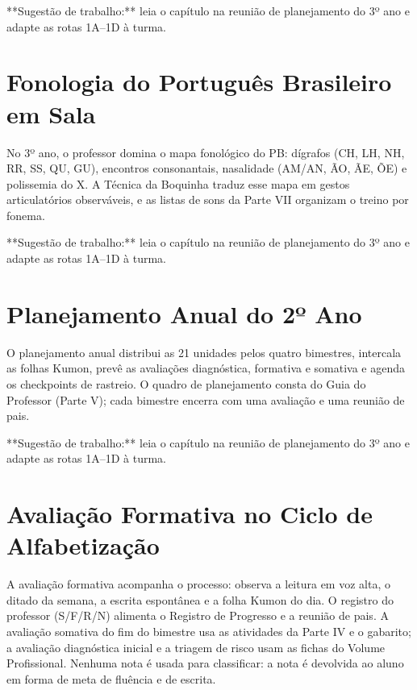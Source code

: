 \begin{dica}
**Sugestão de trabalho:** leia o capítulo na reunião de planejamento do 3º ano e adapte as rotas 1A–1D à turma.
\end{dica}

\chapter{Fonologia do Português Brasileiro em Sala}

No 3º ano, o professor domina o mapa fonológico do PB: dígrafos (CH, LH, NH, RR, SS, QU, GU), encontros consonantais, nasalidade (AM/AN, ÃO, ÃE, ÕE) e polissemia do X. A Técnica da Boquinha traduz esse mapa em gestos articulatórios observáveis, e as listas de sons da Parte VII organizam o treino por fonema.


\begin{dica}
**Sugestão de trabalho:** leia o capítulo na reunião de planejamento do 3º ano e adapte as rotas 1A–1D à turma.
\end{dica}

\chapter{Planejamento Anual do 2º Ano}

O planejamento anual distribui as 21 unidades pelos quatro bimestres, intercala as folhas Kumon, prevê as avaliações diagnóstica, formativa e somativa e agenda os checkpoints de rastreio. O quadro de planejamento consta do Guia do Professor (Parte V); cada bimestre encerra com uma avaliação e uma reunião de pais.


\begin{dica}
**Sugestão de trabalho:** leia o capítulo na reunião de planejamento do 3º ano e adapte as rotas 1A–1D à turma.
\end{dica}

\chapter{Avaliação Formativa no Ciclo de Alfabetização}

A avaliação formativa acompanha o processo: observa a leitura em voz alta, o ditado da semana, a escrita espontânea e a folha Kumon do dia. O registro do professor (S/F/R/N) alimenta o Registro de Progresso e a reunião de pais. A avaliação somativa do fim do bimestre usa as atividades da Parte IV e o gabarito; a avaliação diagnóstica inicial e a triagem de risco usam as fichas do Volume Profissional. Nenhuma nota é usada para classificar: a nota é devolvida ao aluno em forma de meta de fluência e de escrita.


